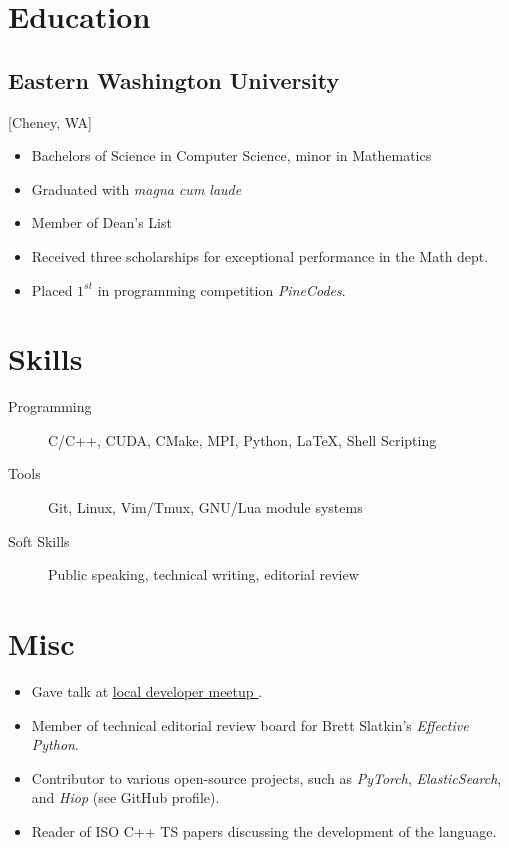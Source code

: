 \documentclass{mycv}
\begin{document}
\section{Education}

\subsection{Eastern Washington University}[Cheney, WA]
\vspace{-\parskip}%
\begin{itemize}[label={}]
  \item Bachelors of Science in Computer Science, minor in Mathematics 
  \item Graduated with \textit{magna cum laude}
  \item Member of Dean's List
  \item Received three scholarships for exceptional performance in the Math dept.
  \item Placed $1^{st}$ in programming competition \textit{PineCodes}. 
\end{itemize}

\section{Skills}

\begin{description}
  \item[Programming] C/C++, CUDA, CMake, MPI, Python, \LaTeX, Shell Scripting
  \item[Tools] Git, Linux, Vim/Tmux, GNU/Lua module systems
  \item[Soft Skills] Public speaking, technical writing, editorial review
\end{description}

\section{Misc}

\begin{itemize}
  \item Gave talk at \href{https://fullstacktc.org/user/ashermancinelli}{ \underline{ local developer meetup } }. 
  \item Member of technical editorial review board for Brett Slatkin's \textit{Effective Python}. 
  \item Contributor to various open-source projects, such as \textit{PyTorch}, \textit{ElasticSearch}, and \textit{Hiop} (see GitHub profile).
  \item Reader of ISO C++ TS papers discussing the development of the language.
\end{itemize}
\end{document}
